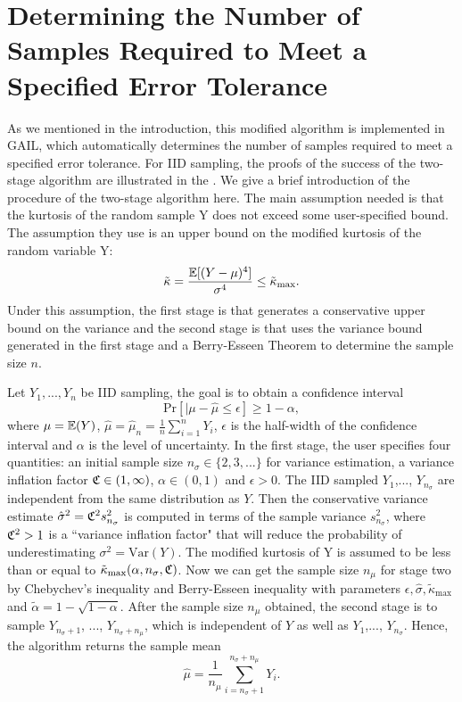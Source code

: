 \documentclass{ws-ijfe}
\begin{document}
\section{Determining the Number of Samples Required to Meet a Specified Error Tolerance}
As we mentioned in the introduction, this modified algorithm is implemented in GAIL, which automatically determines the number of samples required to meet a specified error tolerance. For IID sampling, the proofs of the success of the two-stage algorithm are illustrated in the \cite{HickernellandLan2013}. We give a brief introduction of the procedure of the two-stage algorithm here. The main assumption needed is that the kurtosis of the random sample Y does not exceed some user-specified bound. The assumption they use is an upper bound on the modified kurtosis of the random variable Y:
\begin{equation*}
  \tilde{\kappa}=\frac{\mathbb{E}[(Y-\mu)^4]}{\sigma^4}\leq\tilde{\kappa}_{\text{max}}.
\end{equation*}
Under this assumption, the first stage is that generates a conservative upper bound on the variance and the second stage is that uses the variance bound generated in the first stage and a Berry-Esseen Theorem to determine the sample size $n$.

Let $Y_1,...,Y_n$ be IID sampling, the goal is to obtain a confidence interval
\begin{equation*}
  \text{Pr}[|\mu-\hat{\mu}\leq\epsilon]\geq1-\alpha,
\end{equation*}
where $\mu=\mathbb{E}(Y)$, $\hat{\mu}=\hat{\mu}_n=\frac{1}{n}\sum\limits_{i=1}^{n}Y_i$, $\epsilon$ is the half-width of the confidence interval and $\alpha$ is the level of uncertainty.
In the first stage, the user specifies four quantities: an initial sample size $n_{\sigma}\in\{2,3,...\}$ for variance estimation, a variance inflation factor $\frak{C}\in(1,\infty)$, $\alpha\in(0,1)$ and $\epsilon>0$. The IID sampled $Y_1$,..., $Y_{n_\sigma}$ are independent from the same distribution as $Y$. Then the conservative variance estimate $\hat{\sigma}^2 = \frak{C}^2s_{n_{\sigma}}^2$ is computed in terms of the sample variance $s_{n_{\sigma}}^2$, where $\frak{C}^2>1$ is a ``variance inflation factor" that will reduce the probability of underestimating $\sigma^2=\text{Var}(Y)$. The modified kurtosis of Y is assumed to be less than or equal to $\tilde{\kappa}_{\text{max}}(\alpha,n_{\sigma},\frak{C})$. Now we can get the sample size $n_{\mu}$ for stage two by Chebychev's inequality and Berry-Esseen inequality with parameters $\epsilon, \hat{\sigma}, \tilde{\kappa}_{\text{max}}$ and $\tilde{\alpha}=1-\sqrt{1-\alpha}$. After the sample size $n_{\mu}$ obtained, the second stage is to sample $Y_{n_\sigma+1}$, ..., $Y_{n_\sigma+n_\mu}$, which is independent of $Y$ as well as $Y_1$,..., $Y_{n_\sigma}$. Hence, the algorithm returns the sample mean
\begin{equation*}
  \hat{\mu}=\frac{1}{n_{\mu}}\sum\limits_{i=n_{\sigma}+1}^{n_{\sigma}+n_{\mu}}Y_i.
\end{equation*}
\end{document}
